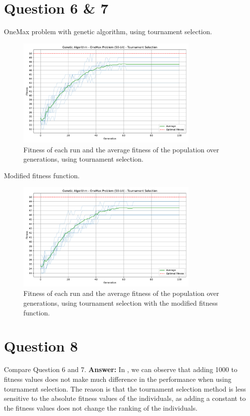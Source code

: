 \documentclass[12pt,letterpaper]{article}
\newcommand{\xAns}{\vskip 2mm\textbf{Answer:} }
\begin{document}
\section*{Question 6 \& 7}
OneMax problem with genetic algorithm, using tournament selection.
\begin{figure}[H]
    \centering
    \includegraphics[width=0.8\textwidth]{images/oneMax_GA_tournament.pdf}
    \caption{Fitness of each run and the average fitness of the population over generations, using tournament selection.}
    \label{fig:6a}
\end{figure}
Modified fitness function.
\begin{figure}[H]
    \centering
    \includegraphics[width=0.8\textwidth]{images/oneMax_GA_tournament_mod.pdf}
    \caption{Fitness of each run and the average fitness of the population over generations, using tournament selection with the modified fitness function.}
    \label{fig:7a}
\end{figure}
\section*{Question 8}
Compare Question 6 and 7. \xAns In , we can observe that adding 1000 to fitness values does not make much difference in the performance when using tournament selection. The reason is that the tournament selection method is less sensitive to the absolute fitness values of the individuals, as adding a constant to the fitness values does not change the ranking of the individuals.
\end{document}
